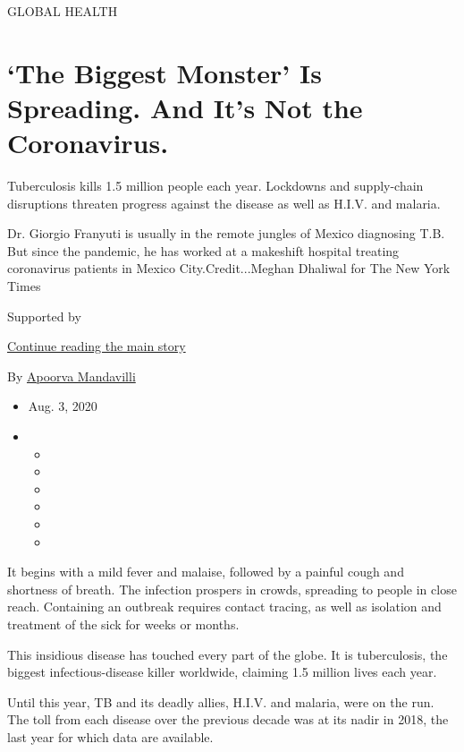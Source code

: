 GLOBAL HEALTH

\hypertarget{the-biggest-monster-is-spreading-and-its-not-the-coronavirus}{%
\section{`The Biggest Monster' Is Spreading. And It's Not the
Coronavirus.}\label{the-biggest-monster-is-spreading-and-its-not-the-coronavirus}}

Tuberculosis kills 1.5 million people each year. Lockdowns and
supply-chain disruptions threaten progress against the disease as well
as H.I.V. and malaria.

Dr. Giorgio Franyuti is usually in the remote jungles of Mexico
diagnosing T.B. But since the pandemic, he has worked at a makeshift
hospital treating coronavirus patients in Mexico City.Credit...Meghan
Dhaliwal for The New York Times

Supported by

\protect\hyperlink{after-sponsor}{Continue reading the main story}

By \href{https://www.nytimes.com/by/apoorva-mandavilli}{Apoorva
Mandavilli}

\begin{itemize}
\item
  Aug. 3, 2020
\item
  \begin{itemize}
  \item
  \item
  \item
  \item
  \item
  \item
  \end{itemize}
\end{itemize}

It begins with a mild fever and malaise, followed by a painful cough and
shortness of breath. The infection prospers in crowds, spreading to
people in close reach. Containing an outbreak requires contact tracing,
as well as isolation and treatment of the sick for weeks or months.

This insidious disease has touched every part of the globe. It is
tuberculosis, the biggest infectious-disease killer worldwide, claiming
1.5 million lives each year.

Until this year, TB and its deadly allies, H.I.V. and malaria, were on
the run. The toll from each disease over the previous decade was at its
nadir in 2018, the last year for which data are available.


